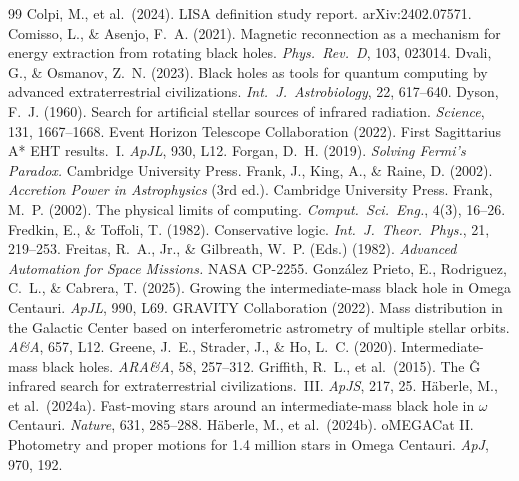 \documentclass[11pt]{article}
\begin{document}
\begin{thebibliography}{99}
 Colpi, M., et al.\ (2024). LISA definition study report. arXiv:2402.07571.
 Comisso, L., \& Asenjo, F.~A. (2021). Magnetic reconnection as a mechanism for energy extraction from rotating black holes. \emph{Phys.\ Rev.\ D}, 103, 023014.
 Dvali, G., \& Osmanov, Z.~N. (2023). Black holes as tools for quantum computing by advanced extraterrestrial civilizations. \emph{Int.\ J.\ Astrobiology}, 22, 617--640.
 Dyson, F.~J. (1960). Search for artificial stellar sources of infrared radiation. \emph{Science}, 131, 1667--1668.
 Event Horizon Telescope Collaboration (2022). First Sagittarius A* EHT results.\ I. \emph{ApJL}, 930, L12.
 Forgan, D.~H. (2019). \emph{Solving Fermi's Paradox.} Cambridge University Press.
 Frank, J., King, A., \& Raine, D. (2002). \emph{Accretion Power in Astrophysics} (3rd ed.). Cambridge University Press.
 Frank, M.~P. (2002). The physical limits of computing. \emph{Comput.\ Sci.\ Eng.}, 4(3), 16--26.
 Fredkin, E., \& Toffoli, T. (1982). Conservative logic. \emph{Int.\ J.\ Theor.\ Phys.}, 21, 219--253.
 Freitas, R.~A., Jr., \& Gilbreath, W.~P. (Eds.) (1982). \emph{Advanced Automation for Space Missions.} NASA CP-2255.
 Gonz\'alez Prieto, E., Rodriguez, C.~L., \& Cabrera, T. (2025). Growing the intermediate-mass black hole in Omega Centauri. \emph{ApJL}, 990, L69.
 GRAVITY Collaboration (2022). Mass distribution in the Galactic Center based on interferometric astrometry of multiple stellar orbits. \emph{A\&A}, 657, L12.
 Greene, J.~E., Strader, J., \& Ho, L.~C. (2020). Intermediate-mass black holes. \emph{ARA\&A}, 58, 257--312.
 Griffith, R.~L., et al.\ (2015). The \^G infrared search for extraterrestrial civilizations.\ III. \emph{ApJS}, 217, 25.
 H\"aberle, M., et al.\ (2024a). Fast-moving stars around an intermediate-mass black hole in $\omega$ Centauri. \emph{Nature}, 631, 285--288.
 H\"aberle, M., et al.\ (2024b). oMEGACat II. Photometry and proper motions for 1.4 million stars in Omega Centauri. \emph{ApJ}, 970, 192.

\end{thebibliography}
\end{document}
